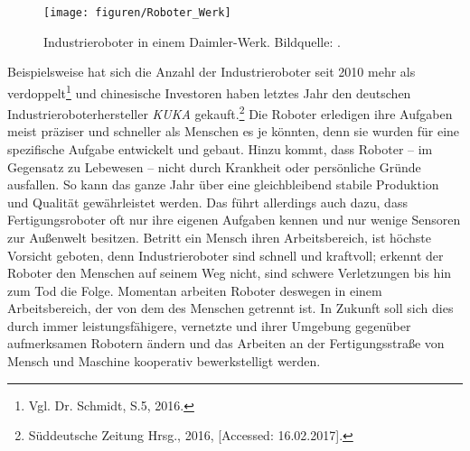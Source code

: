 \begin{figure}[ht]
	\centering
	\texttt{[image: figuren/Roboter\_Werk]}
	\caption{Industrieroboter in einem Daimler-Werk. Bildquelle: \cite{daimlerRoboter}.}
	\label{fig:WerkshalleDaimler}
\end{figure} Beispielsweise hat sich die Anzahl der Industrieroboter seit 2010 mehr als verdoppelt\footnote{ Vgl. Dr. Schmidt, S.5, 2016.} und chinesische Investoren haben letztes Jahr den deutschen Industrieroboterhersteller \textit{KUKA} gekauft.\footnote{ Süddeutsche Zeitung Hrsg., 2016, [Accessed: 16.02.2017].} Die Roboter erledigen ihre Aufgaben meist präziser und schneller als Menschen es je könnten, denn sie wurden für eine spezifische Aufgabe entwickelt und gebaut. Hinzu kommt, dass Roboter -- im Gegensatz zu Lebewesen -- nicht durch Krankheit oder persönliche Gründe ausfallen. So kann das ganze Jahr über eine gleichbleibend stabile Produktion und Qualität gewährleistet werden. Das führt allerdings auch dazu, dass Fertigungsroboter oft nur ihre eigenen Aufgaben kennen und nur wenige Sensoren zur Außenwelt besitzen. Betritt ein Mensch ihren Arbeitsbereich, ist höchste Vorsicht geboten, denn Industrieroboter sind schnell und kraftvoll; erkennt der Roboter den Menschen auf seinem Weg nicht, sind schwere Verletzungen bis hin zum Tod die Folge. Momentan arbeiten Roboter deswegen in einem Arbeitsbereich, der von dem des Menschen getrennt ist. In Zukunft soll sich dies durch immer leistungsfähigere, vernetzte und ihrer Umgebung gegenüber aufmerksamen Robotern ändern und das Arbeiten an der Fertigungsstraße von Mensch und Maschine kooperativ bewerkstelligt werden.
